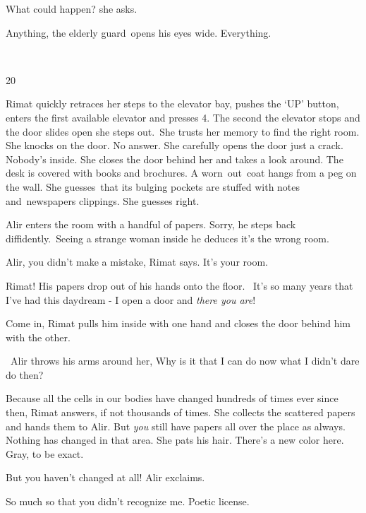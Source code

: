 \documentclass[twoside,11pt]{book}
\begin{document}
{\textquotedbl}What could happen?{\textquotedbl} she asks.

{\textquotedbl}Anything,{\textquotedbl} the elderly guard\ opens his eyes wide.
{\textquotedbl}Everything.{\textquotedbl}

~

20~

Rimat quickly retraces her steps to the elevator bay, pushes the `UP' button, enters the first available elevator and
presses 4. The second the elevator stops and the door slides open she steps out.\ She trusts her memory to find the
right room. She knocks on the door. No answer. She carefully opens the door just a crack. Nobody's inside. She closes
the door behind her and takes a look around. The desk is covered with books and brochures. A worn\ out\ coat hangs from
a peg on the wall. She guesses\ that its bulging pockets are stuffed with notes and{\ }newspapers
clippings. She guesses right.\ 

Alir enters the room with a handful of papers. {\textquotedbl}Sorry,{\textquotedbl} he steps back diffidently.\ Seeing a
strange woman inside he deduces it's the wrong room. 

{\textquotedbl}Alir, you didn't make a mistake,{\textquotedbl} Rimat says. {\textquotedbl}It's your room.{\textquotedbl}


{\textquotedbl}Rimat!{\textquotedbl} His papers drop out of his hands onto the floor.~ {\textquotedbl}It's so many years
that I've had this daydream - I open a door and \textit{there you are}!{\textquotedbl}

{\textquotedbl}Come in,{\textquotedbl} Rimat pulls him inside with one hand and closes the door behind him with the
other.

~Alir throws his arms around her, {\textquotedbl}Why is it that I can do now what I didn't dare do then?{\textquotedbl}

{\textquotedbl}Because all the cells in our bodies have changed hundreds of times ever since then,{\textquotedbl} Rimat
answers, {\textquotedbl}if not thousands of times.{\textquotedbl} She collects the scattered papers and hands them to
Alir. {\textquotedbl}But \textit{you} still have papers all over the place as always. Nothing has changed in that
area.{\textquotedbl} She pats his hair. {\textquotedbl}There's a new color here. Gray, to be exact.{\textquotedbl} 

{\textquotedbl}But you haven't changed at all!{\textquotedbl} Alir exclaims.

{\textquotedbl}So much so that you didn't recognize me. Poetic license.{\textquotedbl} 
\end{document}
